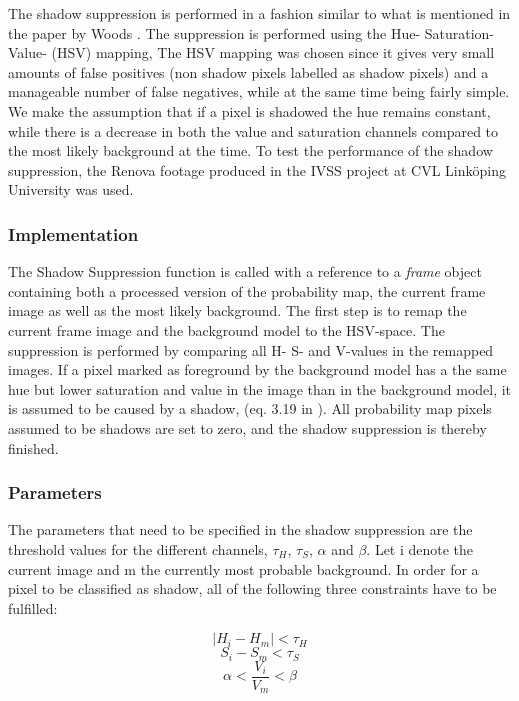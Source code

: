 The shadow suppression is performed in a fashion similar to what is mentioned in the paper by Woods \cite{Wood}. The suppression is performed using the Hue- Saturation- Value- (HSV) mapping, The HSV mapping was chosen since it gives very small amounts of false positives (non shadow pixels labelled as shadow pixels) and a manageable number of false negatives, while at the same time being fairly simple. We make the assumption that if a pixel is shadowed the hue remains constant, while there is a decrease in both the value and saturation channels compared to the most likely background at the time. To test the performance of the shadow suppression, the Renova footage produced in the IVSS project at CVL Linköping University was used. 


\subsubsection{Implementation}
The Shadow Suppression function is called with a reference to a \emph{frame} object containing both a processed version of the probability map, the current frame image as well as the most likely background. The first step is to remap the current frame image and the background model to the HSV-space. The suppression is performed by comparing all H- S- and V-values in the remapped images. If a pixel marked as foreground by the background model has a the same hue but lower saturation and value in the image than in the background model, it is assumed to be caused by a shadow, (eq. 3.19 in \cite{Wood}). All probability map pixels assumed to be shadows are set to zero, and the shadow suppression is thereby finished.

\subsubsection{Parameters}
The parameters that need to be specified in the shadow suppression are the threshold values for the different channels, $\tau_H$, $\tau_S$, $\alpha$ and $\beta$. Let i denote the current image and m the currently most probable background. In order for a pixel to be classified as shadow, all of the following three constraints have to be fulfilled:

\begin{equation}
	|H_i - H_m| < \tau_H
	\label{eq:H}
\end{equation}
\begin{equation}
	S_i - S_m < \tau_S
	\label{eq:S}
\end{equation}
\begin{equation}
	\alpha < \frac{V_i}{V_m} < \beta
	\label{eq:V}
\end{equation}

